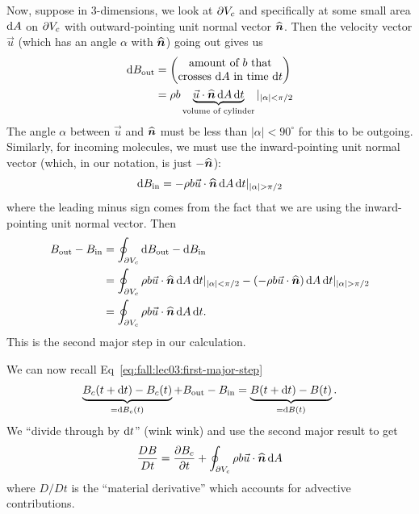 \begin{node}
Now, suppose in 3-dimensions, we look at $\partial V_{c}$ and
specifically at some small area $\mathrm{d} A$ on $\partial V_{c}$ with
outward-pointing unit normal vector $\widehat{\boldsymbol{n}}$. Then the
velocity vector $\vec{u}$ (which has an angle $\alpha$ with $\widehat{\boldsymbol{n}}$) going out gives us
\begin{subequations}
  \begin{align}
\mathrm{d} B_{\text{out}} &= \begin{pmatrix}\mbox{amount of $b$
    that}\\\mbox{crosses $\mathrm{d} A$ in time $\mathrm{d} t$}
\end{pmatrix}\\
&= \rho b \underbrace{\vec{u}\cdot\widehat{\boldsymbol{n}}\,\mathrm{d} A\,\mathrm{d}
  t}_{\text{volume of cylinder}}|_{|\alpha|<\pi/2}
  \end{align}
\end{subequations}
The angle $\alpha$ between $\vec{u}$ and $\widehat{\boldsymbol{n}}$ must be
less than $|\alpha|<90^{\circ}$ for this to be outgoing. Similarly,
for incoming molecules, we must use the inward-pointing unit normal
vector (which, in our notation, is just $-\widehat{\boldsymbol{n}}$):
\begin{equation}
\D B_{\text{in}}=-\rho b \vec{u}\cdot\UnitNormalVec{n}\,\D A\,\D t|_{|\alpha|>\pi/2}
\end{equation}
where the leading minus sign comes from the fact that we are using the
inward-pointing unit normal vector. Then
\begin{subequations}
  \begin{align}
B_{\text{out}}-B_{\text{in}} &= \oint_{\boundary V_{c}}\D B_{\text{out}}-\D B_{\text{in}}\\
&=\oint_{\boundary V_{c}}\rho b \vec{u}\cdot\UnitNormalVec{n}\,\D A\,\D t|_{|\alpha|<\pi/2}-(-\rho b \vec{u}\cdot\UnitNormalVec{n})\,\D A\,\D t|_{|\alpha|>\pi/2}\\
&=\oint_{\boundary V_{c}}\rho b \vec{u}\cdot\UnitNormalVec{n}\,\D A\,\D t.
  \end{align}
\end{subequations}
This is the second major step in our calculation.
\end{node}

\begin{node}
We can now recall
Eq~\eqref{eq:fall:lec03:first-major-step}
\begin{equation}
\underbrace{B_{c}(t+\mathrm{d} t)-B_{c}(t)}_{=\mathrm{d} B_{c}(t)}+B_{\text{out}}-B_{\text{in}}=\underbrace{B(t+\mathrm{d} t)-B(t)}_{=\mathrm{d} B(t)}.
\end{equation}
We ``divide through by $\mathrm{d} t$'' (wink wink) and use the second major
result to get
\begin{equation}
\frac{D B}{D t}=\frac{\partial B_{c}}{\partial t}+\oint_{\partial V_{c}}\rho b \vec{u}\cdot\widehat{\boldsymbol{n}}\,\mathrm{d} A
\end{equation}
where $D/D t$ is the ``material derivative'' which accounts for
advective contributions.
\end{node}

